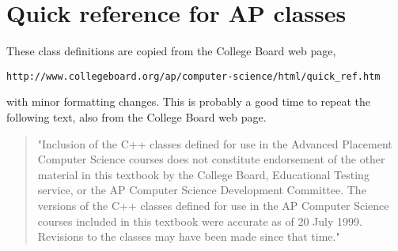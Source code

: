 





\chapter{Quick reference for AP classes}

These class definitions are copied from the College Board
web page,

\begin{verbatim}
http://www.collegeboard.org/ap/computer-science/html/quick_ref.htm
\end{verbatim}

with minor formatting changes.  This is probably a good time to
repeat the following text, also from the College Board web page.

\begin{quotation}
"Inclusion of the C++ classes defined for use in the Advanced
Placement Computer Science courses does not constitute endorsement of
the other material in this textbook by the College Board, Educational
Testing service, or the AP Computer Science Development Committee. The
versions of the C++ classes defined for use in the AP Computer Science
courses included in this textbook were accurate as of 20 July
1999.  Revisions to the classes may have been made since that time."
\end{quotation}

